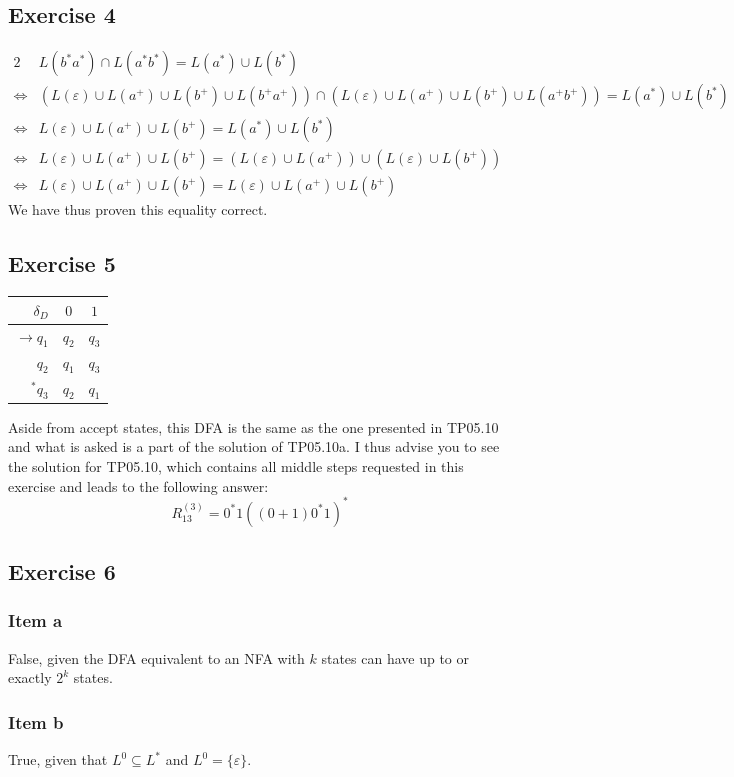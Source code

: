 \documentclass[docid=TP06]{tcom_TP}
\begin{document}
{\subsection{Exercise 4}
\begin{alignat*}{2}
	     & L(b^*a^*)\cap L(a^*b^*) = L(a^*) \cup L(b^*)\\
	\iff & (L(\varepsilon) \cup L(a^+) \cup L(b^+) \cup L(b^+a^+))\cap (L(\varepsilon) \cup L(a^+) \cup L(b^+) \cup L(a^+b^+)) = L(a^*) \cup L(b^*)\\
	\iff & L(\varepsilon) \cup L(a^+) \cup L(b^+) = L(a^*) \cup L(b^*)\\
	\iff & L(\varepsilon) \cup L(a^+) \cup L(b^+) = (L(\varepsilon)\cup L(a^+)) \cup (L(\varepsilon)\cup L(b^+))\\
	\iff & L(\varepsilon) \cup L(a^+) \cup L(b^+) = L(\varepsilon)\cup L(a^+) \cup L(b^+)
\end{alignat*}
We have thus proven this equality correct.
\subsection{Exercise 5}
\begin{center} \begin{tabular}{r | c c}
	$\delta_D       $ & $0  $ & $1  $ \\ \hline
	$\rightarrow q_1$ & $q_2$ & $q_3$\\
	$            q_2$ & $q_1$ & $q_3$\\
	$         ^* q_3$ & $q_2$ & $q_1$
\end{tabular} \end{center}
Aside from accept states, this DFA is the same as the one presented in TP05.10 and what is asked is a part of the solution of TP05.10a. I thus advise you to see the solution for TP05.10, which contains all middle steps requested in this exercise and leads to the following answer:
\begin{equation*}
	R_{13}^{(3)} = 0^*1((0+1)0^*1)^*
\end{equation*}
\subsection{Exercise 6}
\subsubsection{Item a}
False, given the DFA equivalent to an NFA with $k$ states can have up to or exactly $2^k$ states.
\subsubsection{Item b}
True, given that $L^0 \subseteq L^*$ and $L^0=\{\varepsilon\}$.
}
\end{document}
